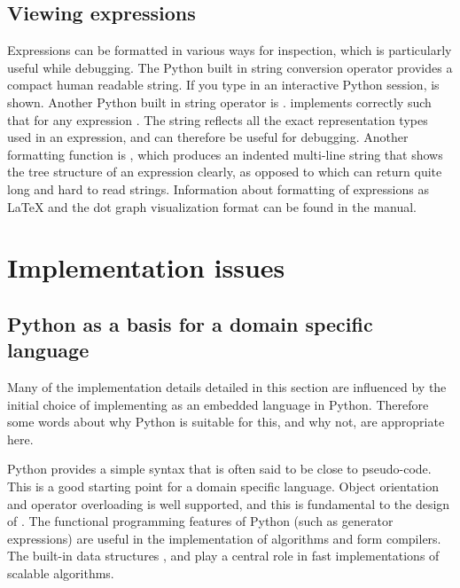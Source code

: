 \subsection{Viewing expressions} \label{ufl:sec:viewing}
Expressions can be formatted in various ways for inspection,
which is particularly useful while debugging.
The Python built in string conversion operator 
provides a compact human readable string. If you type
 in an interactive Python session,
 is shown.
Another Python built in string operator is .
\ufl{} implements  correctly such that
 for any expression .
The string  reflects all the exact representation types
used in an expression, and can therefore be useful for debugging.
Another formatting function is , which produces
an indented multi-line string that shows the tree structure of an
expression clearly, as opposed to  which can return quite
long and hard to read strings.  Information about formatting of
expressions as
\LaTeX{} and the dot graph visualization format
can be found in the manual.

\section{Implementation issues} \label{ufl:sec:implementation}

\subsection{Python as a basis for a domain specific language}

Many of the implementation details detailed in this section are
influenced by the initial choice of implementing \ufl{} as an embedded
language in Python. Therefore some words about why Python is suitable
for this, and why not, are appropriate here.

Python provides a simple syntax that is often said to be close to
pseudo-code. This is a good starting point for a domain specific
language. Object orientation and operator overloading is well
supported, and this is fundamental to the design of \ufl{}. The
functional programming features of Python (such as generator
expressions) are useful in the implementation of algorithms and form
compilers. The built-in data structures
,  and 
play a central role in fast implementations of scalable algorithms.


